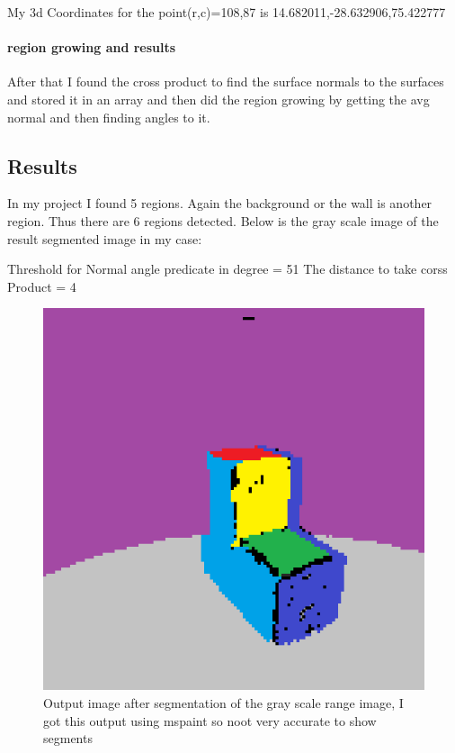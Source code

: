 \documentclass{article}
\begin{document}
My 3d Coordinates for the point(r,c)=108,87 is 14.682011,-28.632906,75.422777

\paragraph{region growing and results}
After that I found the cross product to find the surface normals to the surfaces and stored it in an array and then did the region growing by getting the avg normal and then finding angles to it.

\subsection{Results}
In my project I found 5 regions. Again the background or the wall is another region. Thus there are 6 regions detected. Below is the gray scale image of the result segmented image in my case:

Threshold for Normal angle predicate in degree = 51
The distance to take corss Product = 4

\begin{figure}[!htb]
    \centering
  		\includegraphics[scale=1]{outdeg_51_4.png}
  		\caption{Output image after segmentation of the gray scale range image, I got this output using mspaint so noot very accurate to show segments}
  		\label{Fig1}
\end{figure}
\end{document}
